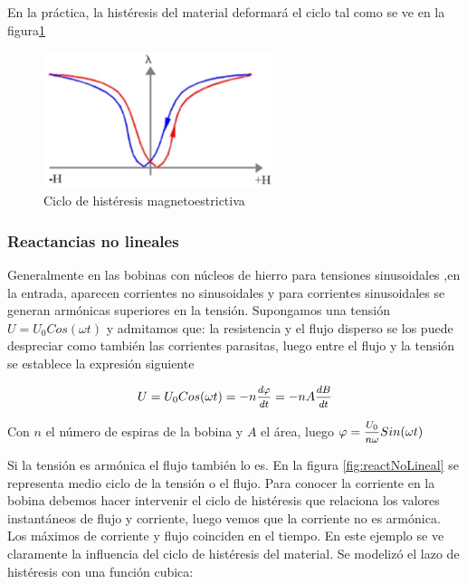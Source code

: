 En la práctica, la histéresis del material deformará el ciclo tal como se ve en la figura\ref{fig:magnetoestrictivoCiclo2}

\begin{figure}[H]
    \centering
    \includegraphics[width=0.6\textwidth]{./Figures/magnetoestrictivoCiclo2}
	\caption{Ciclo de histéresis magnetoestrictiva}
	\label{fig:magnetoestrictivoCiclo2}
\end{figure}

\subsubsection{Reactancias no lineales}

Generalmente en las bobinas con núcleos de hierro para tensiones sinusoidales ,en la entrada, aparecen corrientes no sinusoidales y para corrientes sinusoidales se generan armónicas superiores en la tensión. Supongamos una tensión ${U=U_{0}Cos(\omega t)}$ y admitamos que: la resistencia y el flujo disperso se los puede despreciar como también las corrientes parasitas, luego entre el flujo y la tensión se establece la expresión siguiente

\begin{equation}
U= U_{0}Cos(\omega t) = -n \mfrac{d \varphi}{d t} = -n A \mfrac{dB}{d t}
\end{equation}

Con $n$ el número de espiras de la bobina y $A$ el área, luego ${\varphi = \mfrac{U_{0}}{n \omega} Sin(\omega t)}$

Si la tensión es armónica el flujo también lo es. En la figura \ref{fig:reactNoLineal} se representa medio ciclo de la tensión o el flujo. Para conocer la corriente en la bobina debemos hacer intervenir el ciclo de histéresis que relaciona los valores instantáneos de flujo y corriente, luego vemos que la corriente no es armónica. Los máximos de corriente y flujo coinciden en el tiempo. En este ejemplo se ve claramente la influencia del ciclo de histéresis del material. Se modelizó el lazo de histéresis con una función cubica: 

